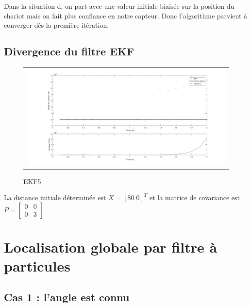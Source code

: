 \documentclass[11pt]{article}		%
\begin{document}
\noindent Dans la situation d, on part avec une valeur initiale biaisée sur la position du chariot mais on fait plus confiance en notre capteur. Donc l'algorithme parvient à converger dès la première itération. 

\subsection{Divergence du filtre EKF}

\vspace{-0.3in}
\label{EKF}
\begin{figure}[ht]
 \begin{center}
  \begin{tabular}{c}
    \includegraphics[width=1.0\textwidth]{ekf_div.png} 
  \end{tabular}
 \end{center}
 \vspace{-0.3in}
 \caption{EKF5}
 \label{EKF5}
\end{figure}

La distance initiale déterminée est $X = [80\; 0]^T$ et la matrice de covariance est $P = \begin{bmatrix}0 & 0\\0 & 3\end{bmatrix}$


\newpage
\section {Localisation globale par filtre à particules}
\label{LocalisationGlobale}

\subsection{Cas 1 : l'angle est connu}
\label{Q1Global}
\end{document}
